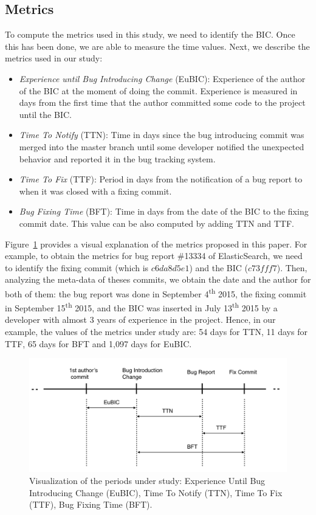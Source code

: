 \documentclass[10pt, conference]{IEEEtran}
\begin{document}
\subsection{Metrics}

To compute the metrics used in this study, we need to identify the BIC. Once this has been done, we are able to measure the time values. Next, we describe the metrics used in our study: 

\begin{itemize}
		\item \emph{Experience until Bug Introducing Change} (EuBIC): Experience of the author of the BIC at the moment of doing the commit. Experience is measured in days from the first time that the author committed some code to the project until the BIC.
		\item \emph{Time To Notify} (TTN): Time in days since the bug introducing commit was merged into the master branch until some developer notified the unexpected behavior and reported it in the bug tracking system. 
		\item \emph{Time To Fix} (TTF): Period in days from the notification of a bug report to when it was closed with a fixing commit.
		\item \emph{Bug Fixing Time} (BFT): Time in days from the date of the BIC to the fixing commit date. This value can be also computed by adding TTN and TTF.
\end{itemize} 

Figure~\ref{fig:metrics} provides a visual explanation of the metrics proposed in this paper. For example, to obtain the metrics for bug report \#13334 of ElasticSearch, we need to identify the fixing commit (which is $c6da8d5e1$) and the BIC ($c73fff7$). Then, analyzing the meta-data of theses commits, we obtain the date and the author for both of them: the bug report was done in September 4\textsuperscript{th} 2015, the fixing commit in  September 15\textsuperscript{th} 2015, and the BIC was inserted in July 13\textsuperscript{th}  2015 by a developer with almost 3 years of experience in the project. Hence, in our example, the values of the metrics under study are: 54 days for TTN, 11 days for TTF, 65 days for BFT and 1,097 days for EuBIC.
\begin{figure}[ht]
\centering
\includegraphics[width=\columnwidth]{metrics.png}
\caption{Visualization of the periods under study: Experience Until Bug Introducing Change (EuBIC),  Time To Notify (TTN), Time To Fix (TTF), Bug Fixing Time (BFT).}
\label{fig:metrics}       %
\end{figure}
\end{document}
